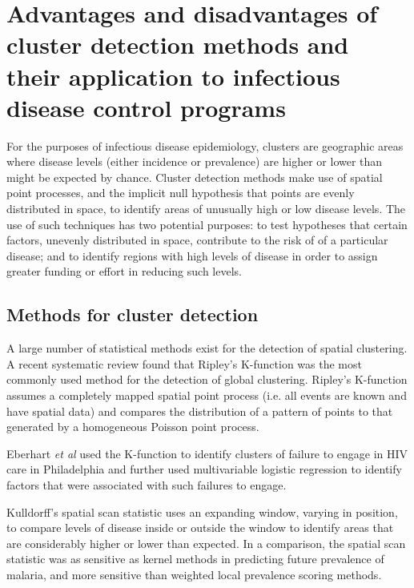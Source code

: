 \documentclass[11pt,a4paper]{article}
\begin{document}
\section{Advantages and disadvantages of cluster detection methods and their application to infectious disease control programs}

For the purposes of infectious disease epidemiology, clusters are geographic areas where disease levels (either incidence or prevalence) are higher or lower than might be expected by chance.
Cluster detection methods make use of spatial point processes, and the implicit null hypothesis that points are evenly distributed in space, to identify areas of unusually high or low disease levels.
The use of such techniques has two potential purposes: to test hypotheses that certain factors, unevenly distributed in space, contribute to the risk of of a particular disease; and to identify regions with high levels of disease in order to assign greater funding or effort in reducing such levels.

\subsection{Methods for cluster detection}
A large number of statistical methods exist for the detection of spatial clustering. 
A recent systematic review found that Ripley's K-function was the most commonly used method for the detection of global clustering. \cite{Fritz2013}
Ripley's K-function assumes a completely mapped spatial point process (i.e. all events are known and have spatial data) and compares the distribution of a pattern of points to that generated by a homogeneous Poisson point process. \cite{Dixon2002} 

Eberhart \textit{et al} used the K-function to identify clusters of failure to engage in HIV care in Philadelphia and further used multivariable logistic regression to identify factors that were associated with such failures to engage. \cite{Eberhart2013}

Kulldorff's spatial scan statistic uses an expanding window, varying in position, to compare levels of disease inside or outside the window to identify areas that are considerably higher or lower than expected.\cite{Kulldorff1995} 
In a comparison, the spatial scan statistic was as sensitive as kernel methods in predicting future prevalence of malaria, and more sensitive than weighted local prevalence scoring methods. \cite{Mosha2014}
\end{document}

